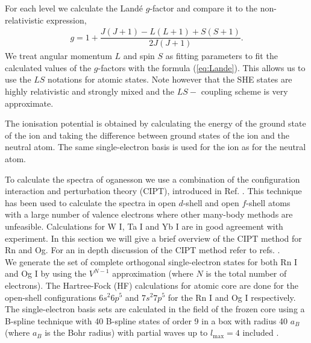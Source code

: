 \documentclass[10pt,a4paper, twoside, openright]{report}
\begin{document}
For each level we calculate the Land\'{e} $g$-factor and compare it to the non-relativistic expression,
\begin{align} \label{eq:Lande}
g =  1 + \dfrac{J(J + 1) - L(L+1) + S(S+1)}{2J(J+1)}.
\end{align}
We treat angular momentum $L$ and spin $S$ as fitting parameters to fit the calculated values of the $g$-factors
with the formula (\ref{eq:Lande}). This allows us to use the $LS$ notations for atomic states.
Note however that the SHE states are highly relativistic and strongly mixed and the $LS-$ coupling scheme 
is very approximate. 

The ionisation potential is obtained by calculating the energy of the ground state of the ion and taking the difference 
between ground states of the ion and the neutral atom. The same single-electron basis is used for the ion as for the
neutral atom. 

To calculate the spectra of oganesson we use a combination of the configuration interaction and perturbation theory (CIPT), introduced in Ref. \cite{DBHF2017}. This technique has been used to calculate the spectra in open $d$-shell and open $f$-shell atoms with a large number of valence electrons where other many-body methods are unfeasible\cite{DBHF2017, LDFDb2018, Dzuba2018}. Calculations for W I, Ta I and Yb I are in good agreement with experiment. In this section we will give a brief overview of the CIPT method for Rn and Og. For an in depth discussion of the CIPT method refer to refs. \cite{DBHF2017}. \\

We generate the set of complete orthogonal single-electron states for both Rn I and Og I by using the $V^{N-1}$ approximation \cite{Kelly1964, Dzuba2005} (where $N$ is the total number of electrons). The Hartree-Fock (HF) calculations for atomic core are done for the open-shell configurations $6s^2 6p^5$ and $7s^2 7p^5$ for the Rn I and Og I respectively. The single-electron basis sets are calculated in the field of the frozen core using a B-spline technique with 40 B-spline states of order 9 in a box with radius 40 $a_B$ (where $a_B$ is the Bohr radius) with partial waves up to $l_{\text{max}} = 4$ included \cite{Johnson1988}. \\
\end{document}
